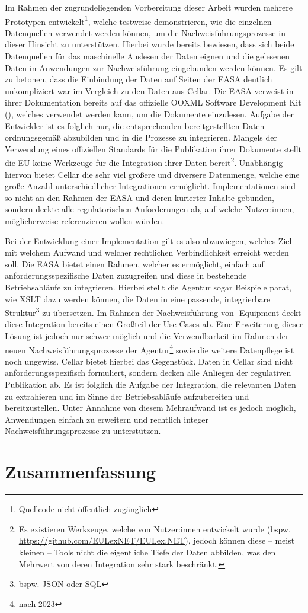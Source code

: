     Im Rahmen der zugrundeliegenden Vorbereitung dieser Arbeit wurden mehrere Prototypen entwickelt\footnote{Quellcode nicht öffentlich zugänglich}, welche testweise demonstrieren, wie die einzelnen Datenquellen verwendet werden können, um die Nachweisführungsprozesse in dieser Hinsicht zu unterstützen.
    Hierbei wurde bereits bewiesen, dass sich beide Datenquellen für das maschinelle Auslesen der Daten eignen und die gelesenen Daten in Anwendungen zur Nachweisführung eingebunden werden können.
    Es gilt zu betonen, dass die Einbindung der Daten auf Seiten der \ac{EASA} deutlich unkompliziert war im Vergleich zu den Daten aus Cellar.
    Die \ac{EASA} verweist in ihrer Dokumentation bereits auf das offizielle \ac{OOXML} Software Development Kit (), welches verwendet werden kann, um die Dokumente einzulesen.
    Aufgabe der Entwickler ist es folglich nur, die entsprechenden bereitgestellten Daten ordnungsgemäß abzubilden und in die Prozesse zu integrieren.
    Mangels der Verwendung eines offiziellen Standards für die Publikation ihrer Dokumente stellt die \ac{EU} keine Werkzeuge für die Integration ihrer Daten bereit\footnote{Es existieren Werkzeuge, welche von Nutzer:innen entwickelt wurde (bspw. \href{https://github.com/EULexNET/EULex.NET}{https://github.com/EULexNET/EULex.NET}), jedoch können diese -- meist kleinen -- Tools nicht die eigentliche Tiefe der Daten abbilden, was den Mehrwert von deren Integration sehr stark beschränkt.}.
    Unabhängig hiervon bietet Cellar die sehr viel größere und diversere Datenmenge, welche eine große Anzahl unterschiedlicher Integrationen ermöglicht.
    Implementationen sind so nicht an den Rahmen der \ac{EASA} und deren kurierter Inhalte gebunden, sondern deckte alle regulatorischen Anforderungen ab, auf welche Nutzer:innen, möglicherweise referenzieren wollen würden.
    
    \medskip
    Bei der Entwicklung einer Implementation gilt es also abzuwiegen, welches Ziel mit welchem Aufwand und welcher rechtlichen Verbindlichkeit erreicht werden soll.
    Die \ac{EASA} bietet einen Rahmen, welcher es ermöglicht, einfach auf anforderungsspezifische Daten zuzugreifen und diese in bestehende Betriebsabläufe zu integrieren.
    Hierbei stellt die Agentur sogar Beispiele parat, wie \ac{XSLT} dazu werden können, die Daten in eine passende, integrierbare Struktur\footnote{bspw. JSON oder SQL} zu übersetzen.
    Im Rahmen der Nachweisführung von \atmans-Equipment deckt diese Integration bereits einen Großteil der Use Cases ab.
    Eine Erweiterung dieser Lösung ist jedoch nur schwer möglich und die Verwendbarkeit im Rahmen der neuen Nachweisführungsprozesse der Agentur\footnote{nach 2023} sowie die weitere Datenpflege ist noch ungewiss.
    Cellar bietet hierbei das Gegenstück. Daten in Cellar sind nicht anforderungsspezifisch formuliert, sondern decken alle Anliegen der regulativen Publikation ab.
    Es ist folglich die Aufgabe der Integration, die relevanten Daten zu extrahieren und im Sinne der Betriebsabläufe aufzubereiten und bereitzustellen.
    Unter Annahme von diesem Mehraufwand ist es jedoch möglich, Anwendungen einfach zu erweitern und rechtlich integer Nachweisführungsprozesse zu unterstützen.

\chapter{Zusammenfassung}

    
